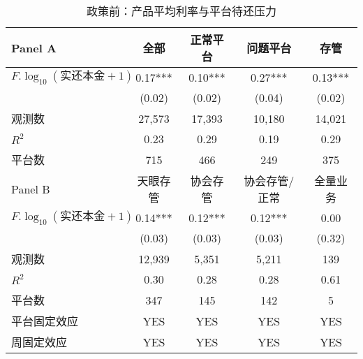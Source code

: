 \documentclass[lang=cn,11pt,authoryear]{elegantpaper}
\begin{document}
\begin{table}[htbp]
  \centering
  \caption{政策前：产品平均利率与平台待还压力}
    \begin{tabular}{lcccc}
    \toprule
    Panel A & 全部    & 正常平台  & 问题平台  & 存管 \\
    \midrule
    $F.\log_{10}(\text{实还本金}+1)$ & 0.17*** & 0.10*** & 0.27*** & 0.13*** \\
          & (0.02) & (0.02) & (0.04) & (0.02) \\
    观测数   & 27,573 & 17,393 & 10,180 & 14,021 \\
    $R^{2}$    & 0.23  & 0.29  & 0.19  & 0.29 \\
    平台数   & 715   & 466   & 249   & 375 \\
    \midrule
    Panel B & 天眼存管  & 协会存管  & 协会存管/正常 & 全量业务 \\
    \midrule
    $F.\log_{10}(\text{实还本金}+1)$ & 0.14*** & 0.12*** & 0.12*** & 0.00 \\
          & (0.03) & (0.03) & (0.03) & (0.32) \\
    观测数   & 12,939 & 5,351 & 5,211 & 139 \\
    $R^{2}$    & 0.30  & 0.28  & 0.28  & 0.61 \\
    平台数   & 347   & 145   & 142   & 5 \\
    平台固定效应 & YES   & YES   & YES   & YES \\
    周固定效应 & YES   & YES   & YES   & YES \\
    \bottomrule
    \end{tabular}%
  \label{tab:policy_before}%
\end{table}%
\end{document}
